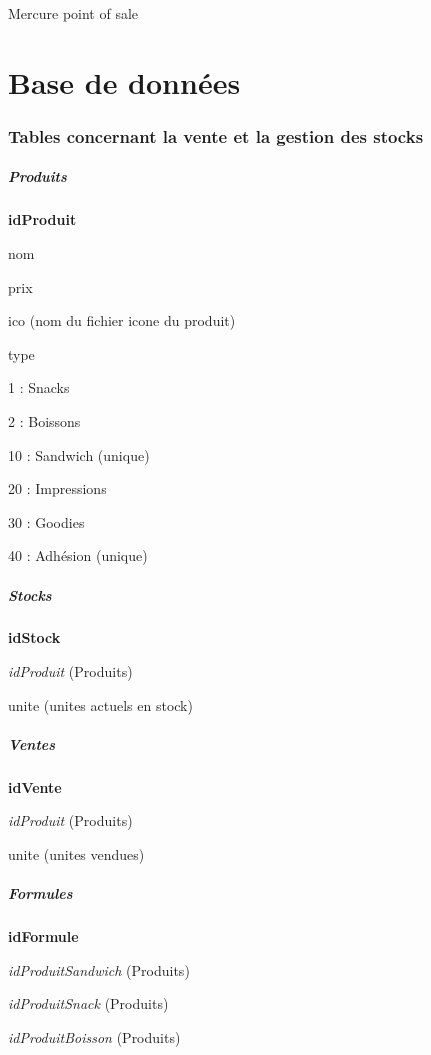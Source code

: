 Mercure point of sale

\section*{Base de données}

\subsubsection*{Tables concernant la vente et la gestion des stocks}

\subparagraph*{Produits}


\begin{DoxyItemize}
\item {\bfseries id\+Produit}
\item nom
\item prix
\item ico (nom du fichier icone du produit)
\item type
\begin{DoxyItemize}
\item 1 \+: Snacks
\item 2 \+: Boissons
\item 10 \+: Sandwich (unique)
\item 20 \+: Impressions
\item 30 \+: Goodies
\item 40 \+: Adhésion (unique)
\end{DoxyItemize}
\end{DoxyItemize}

\subparagraph*{Stocks}


\begin{DoxyItemize}
\item {\bfseries id\+Stock}
\item {\itshape id\+Produit} (Produits)
\item unite (unites actuels en stock)
\end{DoxyItemize}

\subparagraph*{Ventes}


\begin{DoxyItemize}
\item {\bfseries id\+Vente}
\item {\itshape id\+Produit} (Produits)
\item unite (unites vendues)
\end{DoxyItemize}

\subparagraph*{Formules}


\begin{DoxyItemize}
\item {\bfseries id\+Formule}
\item {\itshape id\+Produit\+Sandwich} (Produits)
\item {\itshape id\+Produit\+Snack} (Produits)
\item {\itshape id\+Produit\+Boisson} (Produits)
\end{DoxyItemize}

